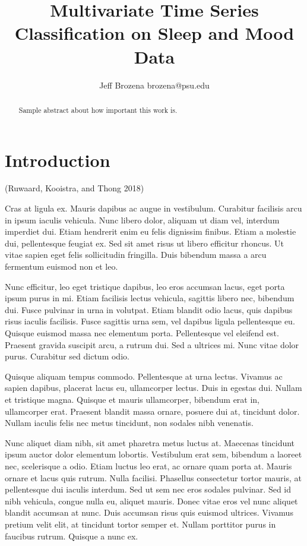 \documentclass{article}
\begin{document}
\title{Multivariate Time Series Classification on Sleep and Mood Data}

\author{\name Jeff Brozena \email brozena@psu.edu}
\maketitle

\begin{abstract}%
  Sample abstract about how important this work is.
\end{abstract}

\hypertarget{introduction}{%
\section{Introduction}\label{introduction}}

(Ruwaard, Kooistra, and Thong 2018)

Cras at ligula ex. Mauris dapibus ac augue in vestibulum. Curabitur
facilisis arcu in ipsum iaculis vehicula. Nunc libero dolor, aliquam ut
diam vel, interdum imperdiet dui. Etiam hendrerit enim eu felis
dignissim finibus. Etiam a molestie dui, pellentesque feugiat ex. Sed
sit amet risus ut libero efficitur rhoncus. Ut vitae sapien eget felis
sollicitudin fringilla. Duis bibendum massa a arcu fermentum euismod non
et leo.

Nunc efficitur, leo eget tristique dapibus, leo eros accumsan lacus,
eget porta ipsum purus in mi. Etiam facilisis lectus vehicula, sagittis
libero nec, bibendum dui. Fusce pulvinar in urna in volutpat. Etiam
blandit odio lacus, quis dapibus risus iaculis facilisis. Fusce sagittis
urna sem, vel dapibus ligula pellentesque eu. Quisque euismod massa nec
elementum porta. Pellentesque vel eleifend est. Praesent gravida
suscipit arcu, a rutrum dui. Sed a ultrices mi. Nunc vitae dolor purus.
Curabitur sed dictum odio.

Quisque aliquam tempus commodo. Pellentesque at urna lectus. Vivamus ac
sapien dapibus, placerat lacus eu, ullamcorper lectus. Duis in egestas
dui. Nullam et tristique magna. Quisque et mauris ullamcorper, bibendum
erat in, ullamcorper erat. Praesent blandit massa ornare, posuere dui
at, tincidunt dolor. Nullam iaculis felis nec metus tincidunt, non
sodales nibh venenatis.

Nunc aliquet diam nibh, sit amet pharetra metus luctus at. Maecenas
tincidunt ipsum auctor dolor elementum lobortis. Vestibulum erat sem,
bibendum a laoreet nec, scelerisque a odio. Etiam luctus leo erat, ac
ornare quam porta at. Mauris ornare et lacus quis rutrum. Nulla
facilisi. Phasellus consectetur tortor mauris, at pellentesque dui
iaculis interdum. Sed ut sem nec eros sodales pulvinar. Sed id nibh
vehicula, congue nulla eu, aliquet mauris. Donec vitae eros vel nunc
aliquet blandit accumsan at nunc. Duis accumsan risus quis euismod
ultrices. Vivamus pretium velit elit, at tincidunt tortor semper et.
Nullam porttitor purus in faucibus rutrum. Quisque a nunc ex.
\end{document}
